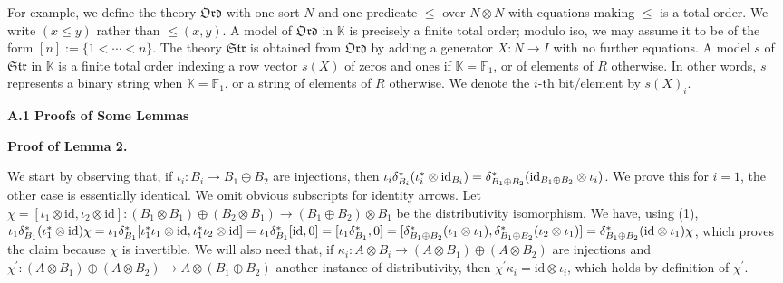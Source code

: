  
 
For example, we define the theory $\mathfrak{Ord}$ with one sort $N$ and one predicate $\leq$ over $N\otimes N$ with equations making $\leq$ is a total order. We write $(x\leq y)$ rather than $\mathop{\leq}(x,y)$. A model of $\mathfrak{Ord}$ in $\mathbb{K}$ is precisely a finite total order; modulo iso, we may assume it to be of the form $[n]:=\{1<\cdots<n\}$. The theory $\mathfrak{Str}$ is obtained from $\mathfrak{Ord}$ by adding a generator $X:N\to I$ with no further equations. A model $s$ of $\mathfrak{Str}$ in $\mathbb{K}$ is a finite total order indexing a row vector $s(X)$ of zeros and ones if $\mathbb{K}=\mathbb{F}_{1}$, or of elements of $R$ otherwise. In other words, $s$ represents a binary string when $\mathbb{K}=\mathbb{F}_{1}$, or a string of elements of $R$ otherwise. We denote the $i$-th bit/element by $s(X)_{i}$.\par
 
 
 


 
\par\medskip\noindent\textbf{A.1 Proofs of Some Lemmas}\par
 
 
\par\medskip\noindent\textbf{Proof of Lemma 2.}\par
 
 
We start by observing that, if $\iota_{i}:B_{i}\to B_{1}\oplus B_{2}$ are injections, then $\iota_{i}\delta^{\ast}_{B_{i}}(\iota^{\ast}_{i}\otimes\mathrm{id}_{B_{i}})=%
\delta^{\ast}_{B_{1}\oplus B_{2}}(\mathrm{id}_{B_{1}\oplus B_{2}}\otimes\iota_%
{i})$. We prove this for $i=1$, the other case is essentially identical. We omit obvious subscripts for identity arrows. Let $\chi=[\iota_{1}\otimes\mathrm{id},\iota_{2}\otimes\mathrm{id}]:(B_{1}\otimes B%
_{1})\oplus(B_{2}\otimes B_{1})\to(B_{1}\oplus B_{2})\otimes B_{1}$ be the distributivity isomorphism. We have, using (1), $\iota_{1}\delta^{\ast}_{B_{1}}(\iota^{\ast}_{1}\otimes\mathrm{id})\chi=\iota_{%
1}\delta^{\ast}_{B_{1}}[\iota^{\ast}_{1}\iota_{1}\otimes\mathrm{id},\iota^{%
\ast}_{1}\iota_{2}\otimes\mathrm{id}]=\iota_{1}\delta^{\ast}_{B_{1}}[\mathrm{%
id},0]=[\iota_{1}\delta^{\ast}_{B_{1}},0]=[\delta^{\ast}_{B_{1}\oplus B_{2}}(%
\iota_{1}\otimes\iota_{1}),\delta^{\ast}_{B_{1}\oplus B_{2}}(\iota_{2}\otimes%
\iota_{1})]=\delta^{\ast}_{B_{1}\oplus B_{2}}(\mathrm{id}\otimes\iota_{1})\chi$, which proves the claim because $\chi$ is invertible. We will also need that, if $\kappa_{i}:A\otimes B_{i}\to(A\otimes B_{1})\oplus(A\otimes B_{2})$ are injections and $\chi^{\prime}:(A\otimes B_{1})\oplus(A\otimes B_{2})\to A\otimes(B_{1}\oplus B%
_{2})$ another instance of distributivity, then $\chi^{\prime}\kappa_{i}=\mathrm{id}\otimes\iota_{i}$, which holds by definition of $\chi^{\prime}$.\par
 
